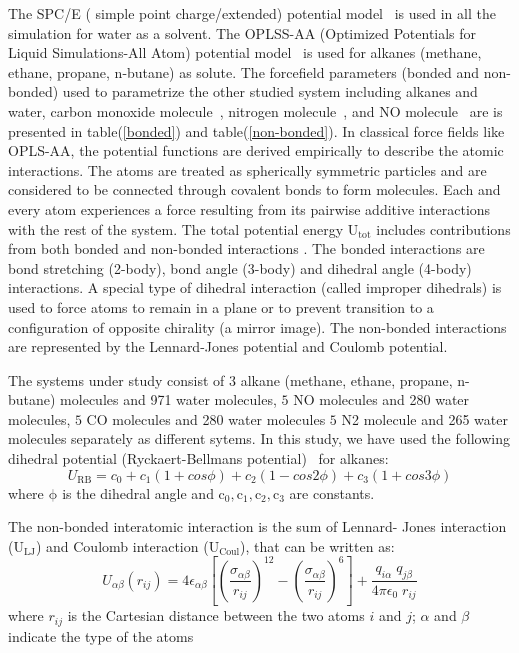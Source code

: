 The SPC/E ( simple point charge/extended) potential  model~ \citep{berendsen1987missing} is used in all the simulation for water as a solvent. The OPLSS-AA (Optimized Potentials for Liquid Simulations-All Atom) potential model~ \citep{kaminski2001evaluation}  is used for alkanes (methane, ethane, propane, n-butane) as  solute. The forcefield parameters (bonded and non-bonded)  used to parametrize the other  studied system including alkanes and water, carbon monoxide molecule~\citep{kowalczyk2012molecular, banwell1994fundamentals}, nitrogen molecule~\citep{atkins2009quanta, bouanich1992site}, and NO molecule~\citep{zhou2005molecular} are is presented in table(\ref{bonded}) and table(\ref{non-bonded}). In classical force fields like OPLS-AA, the potential functions are derived empirically to describe the atomic interactions. The atoms are treated as spherically symmetric particles and are considered to be connected through covalent bonds to form molecules. Each and every atom experiences a force resulting from its pairwise additive interactions with the rest of the system. The total potential energy $\mathrm{U_{tot}}$  includes contributions from both bonded and  non-bonded interactions  \citep{Gromacs-manual}. The bonded interactions are bond stretching (2-body), bond angle (3-body) and dihedral angle (4-body) interactions. A special type of dihedral interaction (called improper dihedrals) is used to force atoms to remain in a plane or to prevent transition to a configuration of opposite chirality (a mirror image). The non-bonded   interactions are represented by the Lennard-Jones potential  and Coulomb potential. 

The systems under study consist of $3$ alkane (methane, ethane, propane, n-butane) molecules and 971 water molecules,  $5$ NO molecules and 280 water molecules,  $5$ CO molecules and 280 water molecules  $5$ N2 molecule and 265 water molecules separately as different sytems. In this study, we have used  the following  dihedral potential (Ryckaert-Bellmans potential)~ \citep{Gromacs-manual} for alkanes:   
\begin{equation}
U_{\text{RB}} = c_0 + c_1(1+ cos\phi)  + c_2(1- cos2\phi) + c_3 (1+ cos3\phi) 
\end{equation}
where $\mathrm{\phi}$ is the dihedral angle and $\mathrm{c_0, c_1, c_2, c_3}$ are constants.

The non-bonded interatomic interaction is the sum of Lennard- Jones interaction ($\mathrm {U_ {LJ}}$)  and Coulomb interaction ($\mathrm {U_ {Coul}}$), that can be written as:
\begin{equation}
U_{\alpha\beta}(r_{ij}) = 4\epsilon_{\alpha \beta}\left[\left(\frac{\sigma_{\alpha\beta}}{r_{ij}}\right)^{12} - \left(\frac{\sigma_{\alpha\beta}}{r_{ij}}\right)^6\right] +  \frac{q_{i\alpha}\;q_{j\beta}}{4\pi\epsilon_0\;r_{ij}}
\end{equation}
 where $r_{ij}$ is the Cartesian distance between the two atoms $i$ and $j$; $\alpha$ and $\beta$  indicate the type of the atoms

